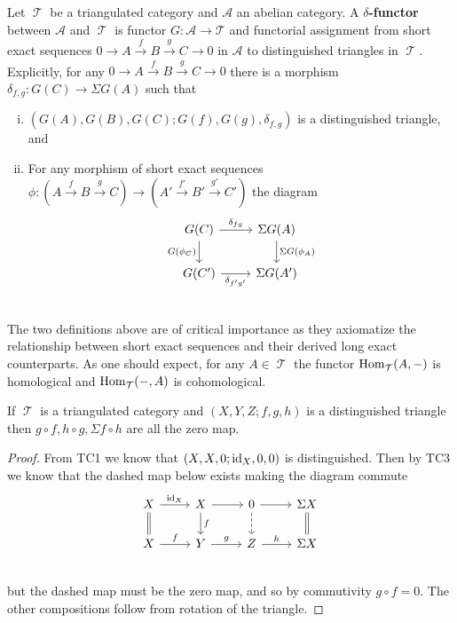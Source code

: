 \documentclass[11pt]{article}
\DeclareMathOperator{\TT}{\mathcal{T}}
\begin{document}
\begin{defn}
Let $\TT$ be a triangulated category and $\mathcal{A}$ an abelian category. A \textbf{$\delta$-functor} between $\mathcal{A}$ and $\TT$ is functor $G: \mathcal{A} \to \mathcal{T}$ and functorial assignment from short exact sequences $0 \to A \xrightarrow{f} B \xrightarrow{g} C \to 0$ in $\mathcal{A}$ to distinguished triangles in $\TT$. Explicitly, for any $0 \to A \xrightarrow{f} B \xrightarrow{g} C \to 0$ there is a morphism $\delta_{f,g}: G(C) \to \Sigma G(A)$ such that
\begin{enumerate}[i.]
	\item $(G(A),G(B),G(C); G(f),G(g),\delta_{f,g})$ is a distinguished triangle, and
	\item For any morphism of short exact sequences $\phi: (A \xrightarrow{f} B \xrightarrow{g} C) \to (A' \xrightarrow{f'} B' \xrightarrow{g'} C')$ the diagram 
		\[\begin{tikzcd}
G(C) \ar[r,"\delta_{fg}"] \ar[d,"G(\phi_C)"'] & \Sigma G(A) \ar[d,"\Sigma G(\phi_A)"] \\
G(C') \ar[r,"\delta_{f'g'}"'] & \Sigma G(A') \\
		\end{tikzcd}\]
\end{enumerate}
\end{defn}

The two definitions above are of critical importance as they axiomatize the relationship between short exact sequences and their derived long exact counterparts. As one should expect, for any $A \in \TT$ the functor $\Hom_{\TT}(A,-)$ is homological and $\Hom_{\TT}(-,A)$ is cohomological.

\begin{lem}
If $\TT$ is a triangulated category and $(X,Y,Z; f,g,h)$ is a distinguished triangle then $g\circ f,h\circ g,\Sigma f\circ h$ are all the zero map.
\end{lem}
\begin{proof}
From TC1 we know that $(X,X,0; \operatorname{id}_X, 0,0)$ is distinguished. Then by TC3 we know that the dashed map below exists making the diagram commute
\[\begin{tikzcd}
X \ar[r,"\id_X"] \ar[d, equal] & X \ar[r] \ar[d,"f"] & 0 \ar[d,dashed] \ar[r] & \Sigma X \ar[d,equal]\\
X \ar[r,"f"] & Y \ar[r,"g"] & Z \ar[r,"h"] & \Sigma X\\
\end{tikzcd}\]
but the dashed map must be the zero map, and so by commutivity $g\circ f= 0 $. The other compositions follow from rotation of the triangle.
\end{proof}
\end{document}
